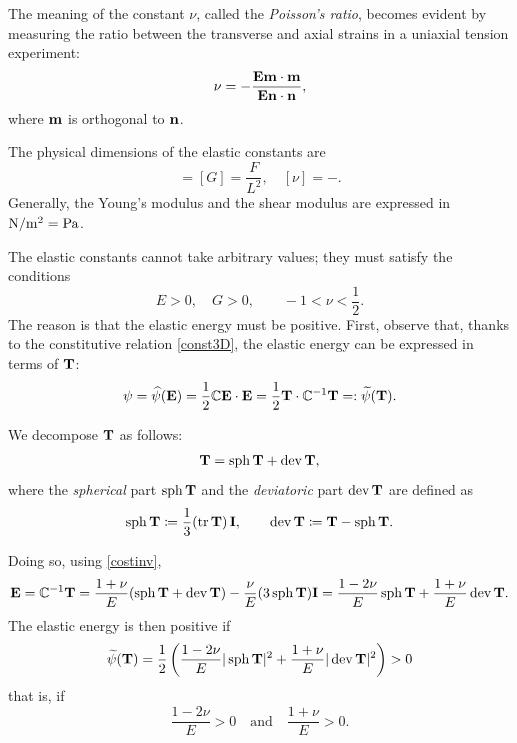 \begin{enumerate}
	The meaning of the constant $\nu$, called the \textit{Poisson's ratio}, becomes evident by measuring the ratio between the transverse and axial strains in a uniaxial tension experiment:
	\begin{equation}
		\nu=-\frac{\mathbf{E} \mathbf{m} \cdot \mathbf{m}}{\mathbf{E} \mathbf{n} \cdot \mathbf{n}},
	\end{equation}
	where $\mathbf{m}$ is orthogonal to $\mathbf{n}$.
\end{enumerate}

\vspace{.3cm}
The physical dimensions of the elastic constants are
\begin{equation}
	[E]=[G]=\frac{F}{L^2}, \quad [\nu]=-.
\end{equation}
Generally, the Young’s modulus and the shear modulus are expressed in ${\rm N}/{\rm m}^2={\rm Pa}$.

\vspace{.3cm}

The elastic constants cannot take arbitrary values; they must satisfy the conditions
\begin{equation}
	E>0, \quad G>0, \qquad -1<\nu<\frac12.
\end{equation}
The reason is that the elastic energy must be positive. First, observe that, thanks to the constitutive relation \eqref{const3D}, the elastic energy can be expressed in terms of $\mathbf{T}$:
\begin{equation}
	\psi=\widehat\psi(\mathbf{E})=\frac12 \mathbb{C} \mathbf{E} \cdot \mathbf{E} =\frac 12 \mathbf{T} \cdot \mathbb{C}^{-1}\mathbf{T}=:\widetilde{\psi}(\mathbf{T}).
\end{equation}

We decompose $\mathbf{T}$ as follows:
\begin{equation}
	\mathbf{T}=\operatorname{sph}\mathbf{T}+\operatorname{dev}\mathbf{T}, 
\end{equation}
where the \textit{spherical} part $\operatorname{sph}\mathbf{T}$ and the \textit{deviatoric} part $\operatorname{dev}\mathbf{T}$ are defined as
\begin{equation}
	\operatorname{sph}\mathbf{T}\coloneqq \frac{1}{3}(\operatorname{tr}\mathbf{T})\, \mathbf{I}, \qquad \operatorname{dev}\mathbf{T}\coloneqq \mathbf{T}-	\operatorname{sph}\mathbf{T}.
\end{equation}

Doing so, using \eqref{costinv},
\begin{equation}
	\mathbf{E}=\mathbb{C} ^{-1}\mathbf{T} =\frac{1+\nu}{E}(\operatorname{sph}\mathbf{T}+\operatorname{dev}\mathbf{T})-\frac{\nu}{E}(3	\operatorname{sph}\mathbf{T})\mathbf{I}=\frac{1-2\nu}{E}	\operatorname{sph}\mathbf{T}+\frac{1+\nu}{E}	\operatorname{dev}\mathbf{T}.
\end{equation}
The elastic energy is then positive if
\begin{equation}\label{ensf}
	\widetilde{\psi}(\mathbf{T})=\frac{1}{2}\left( \frac{1-2\nu}{E}	|\operatorname{sph}\mathbf{T}|^2+\frac{1+\nu}{E}	|\operatorname{dev}\mathbf{T}|^2\right)>0
\end{equation}
that is, if
\begin{equation}
	\frac{1-2\nu}{E}>0 \quad \textrm{and} \quad \frac{1+\nu}{E}>0.
\end{equation}


